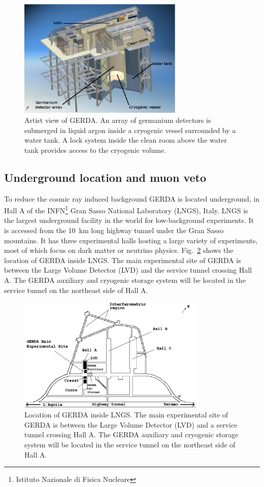 \begin{figure}[tbhp]
\centering
\includegraphics[width=0.7\textwidth]{gerda}
\caption{Artist view of GERDA. An array of germanium detectors is submerged in liquid argon inside a cryogenic vessel surrounded by a water tank. A lock system inside the clean room above the water tank provides access to the cryogenic volume.}
\label{fig:gerda}
\end{figure}

\subsection{Underground location and muon veto}
\label{sec:gerda:loca}
To reduce the cosmic ray induced background GERDA is located underground, in Hall A of the INFN\footnote{Istituto Nazionale di Fisica Nucleare} Gran Sasso National Laboratory (LNGS), Italy. LNGS is the largest underground facility in the world for low-background experiments. It is accessed from the 10~km long highway tunnel under the Gran Sasso mountains. It has three experimental halls hosting a large variety of experiments, most of which focus on dark matter or neutrino physics. Fig.~\ref{fig:lngs} shows the location of GERDA inside LNGS. The main experimental site of GERDA is between the Large Volume Detector (LVD) and the service tunnel crossing Hall A. The GERDA auxiliary and cryogenic storage system will be located in the service tunnel on the northeast side of Hall A.

\begin{figure}[tbhp]
\centering
\includegraphics[width=0.8\textwidth]{lngs}  
\caption{Location of GERDA inside LNGS. The main experimental site of GERDA is between the Large Volume Detector (LVD) and a service tunnel crossing Hall A. The GERDA auxiliary and cryogenic storage system will be located in the service tunnel on the northeast side of Hall A.}
\label{fig:lngs}
\end{figure}

